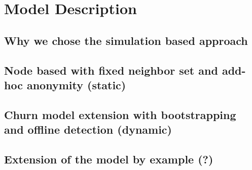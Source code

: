 \chapter{Model Description}

\section{Why we chose the simulation based approach}
\section{Node based with fixed neighbor set and add-hoc anonymity (static)}
\section{Churn model extension with bootstrapping and offline detection (dynamic)}
\section{Extension of the model by example (?)}
